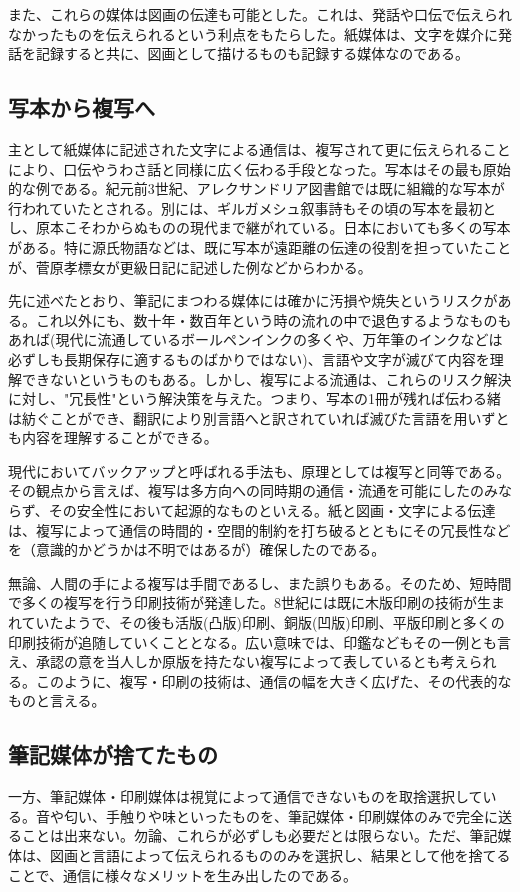 また、これらの媒体は図画の伝達も可能とした。これは、発話や口伝で伝えられなかったものを伝えられるという利点をもたらした。紙媒体は、文字を媒介に発話を記録すると共に、図画として描けるものも記録する媒体なのである。

\subsection{写本から複写へ}
主として紙媒体に記述された文字による通信は、複写されて更に伝えられることにより、口伝やうわさ話と同様に広く伝わる手段となった。写本はその最も原始的な例である。紀元前3世紀、アレクサンドリア図書館では既に組織的な写本が行われていたとされる。別には、ギルガメシュ叙事詩もその頃の写本を最初とし、原本こそわからぬものの現代まで継がれている。日本においても多くの写本がある。特に源氏物語などは、既に写本が遠距離の伝達の役割を担っていたことが、菅原孝標女が更級日記に記述した例などからわかる。

先に述べたとおり、筆記にまつわる媒体には確かに汚損や焼失というリスクがある。これ以外にも、数十年・数百年という時の流れの中で退色するようなものもあれば(現代に流通しているボールペンインクの多くや、万年筆のインクなどは必ずしも長期保存に適するものばかりではない)、言語や文字が滅びて内容を理解できないというものもある。しかし、複写による流通は、これらのリスク解決に対し、"冗長性"という解決策を与えた。つまり、写本の1冊が残れば伝わる緒は紡ぐことができ、翻訳により別言語へと訳されていれば滅びた言語を用いずとも内容を理解することができる。

現代においてバックアップと呼ばれる手法も、原理としては複写と同等である。その観点から言えば、複写は多方向への同時期の通信・流通を可能にしたのみならず、その安全性において起源的なものといえる。紙と図画・文字による伝達は、複写によって通信の時間的・空間的制約を打ち破るとともにその冗長性などを（意識的かどうかは不明ではあるが）確保したのである。

無論、人間の手による複写は手間であるし、また誤りもある。そのため、短時間で多くの複写を行う印刷技術が発達した。8世紀には既に木版印刷の技術が生まれていたようで、その後も活版(凸版)印刷、銅版(凹版)印刷、平版印刷と多くの印刷技術が追随していくこととなる。広い意味では、印鑑などもその一例とも言え、承認の意を当人しか原版を持たない複写によって表しているとも考えられる。このように、複写・印刷の技術は、通信の幅を大きく広げた、その代表的なものと言える。

\subsection{筆記媒体が捨てたもの}
一方、筆記媒体・印刷媒体は視覚によって通信できないものを取捨選択している。音や匂い、手触りや味といったものを、筆記媒体・印刷媒体のみで完全に送ることは出来ない。勿論、これらが必ずしも必要だとは限らない。ただ、筆記媒体は、図画と言語によって伝えられるもののみを選択し、結果として他を捨てることで、通信に様々なメリットを生み出したのである。

